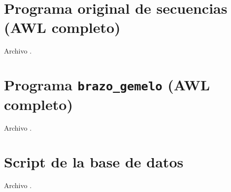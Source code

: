 \chapter{Programa original de secuencias (AWL completo)}\label{ap:original}
Archivo .


\chapter{Programa \texttt{brazo\_gemelo} (AWL completo)}\label{ap:gemelo}
Archivo .


\chapter{Script de la base de datos}\label{ap:sql}
Archivo .


